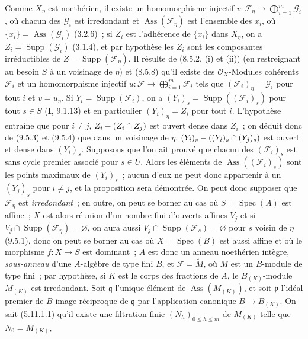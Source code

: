 Comme $X_\eta$ est noethérien, il existe un homomorphisme injectif
$v:\mathcal F_\eta\to\bigoplus_{i=1}^m\mathcal G_i$, où chacun des $\mathcal G_i$ est
irredondant et $\operatorname{Ass}(\mathcal F_\eta)$ est l'ensemble des $x_i$, où
$\{x_i\}=\operatorname{Ass}(\mathcal G_i)$ (3.2.6)~; si $Z_i$ est l'adhérence de
$\{x_i\}$ dans $X_\eta$, on a $Z_i=\operatorname{Supp}(\mathcal G_i)$ (3.1.4), et
par hypothèse les $Z_i$ sont les composantes irréductibles de
$Z=\operatorname{Supp}(\mathcal F_\eta)$. Il résulte de (8.5.2, (i) et (ii)) (en
restreignant au besoin $S$ à un voisinage de $\eta$) et (8.5.8) qu'il existe des
$\mathcal O_X$-Modules cohérents $\mathcal F_i$ et un homomorphisme injectif
$u:\mathcal F\to\bigoplus_{i=1}^m\mathcal F_i$ tels que $(\mathcal F_i)_\eta=\mathcal G_i$ pour
tout $i$ et $v=u_\eta$. Si $Y_i=\operatorname{Supp}(\mathcal F_i)$, on a
$(Y_i)_s=\operatorname{Supp}((\mathcal F_i)_s)$ pour tout $s\in S$
(\textbf{I}, 9.1.13) et en particulier $(Y_i)_\eta=Z_i$ pour tout $i$.
L'hypothèse entraîne que pour $i\neq j$, $Z_i-(Z_i\cap Z_j)$ est ouvert dense
dans $Z_i$~; on déduit donc de (9.5.3) et (9.5.4) que dans un voisinage de
$\eta$, $(Y_i)_s-((Y_i)_s\cap(Y_j)_s)$ est ouvert et dense dans $(Y_i)_s$.
Supposons que l'on ait prouvé que chacun des $(\mathcal F_i)_s$ est sans cycle
premier associé pour $s\in U$. Alors les éléments de
$\operatorname{Ass}((\mathcal F_i)_s)$ sont les points maximaux de $(Y_i)_s$~;
aucun d'eux ne peut donc appartenir à un $(Y_j)_s$ pour $i\neq j$, et la
proposition sera démontrée. On peut donc supposer que $\mathcal F_\eta$ est
\emph{irredondant}~; en outre, on peut se borner au cas où
$S=\operatorname{Spec}(A)$ est affine~; $X$ est alors réunion d'un nombre fini
d'ouverts affines $V_j$ et si $V_j\cap\operatorname{Supp}(\mathcal F_\eta)
=\varnothing$, on aura aussi $V_j\cap\operatorname{Supp}(\mathcal F_s)=\varnothing$
pour $s$ voisin de $\eta$ (9.5.1), donc on peut se borner au cas où
$X=\operatorname{Spec}(B)$ est aussi affine et où le morphisme $f:X\to S$ est
dominant~; $A$ est donc un anneau noethérien intègre, \emph{sous-anneau} d'une
$A$-algèbre de type fini $B$, et $\mathcal F=\widetilde M$, où $M$ est un
$B$-module de type fini~; par hypothèse, si $K$ est le corps des fractions de
$A$, le $B_{(K)}$-module $M_{(K)}$ est irredondant. Soit $\mathfrak q$ l'unique
élément de $\operatorname{Ass}(M_{(K)})$, et soit $\mathfrak p$ l'idéal premier
de $B$ image réciproque de $\mathfrak q$ par l'application canonique
$B\to B_{(K)}$. On sait (5.11.1.1) qu'il existe une filtration finie
$(N_h)_{0\leqslant h\leqslant m}$ de $M_{(K)}$ telle que $N_0=M_{(K)}$,
